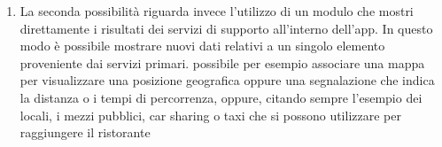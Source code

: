 \begin{itemize}
\begin{enumerate}
	\item La seconda possibilità riguarda invece l'utilizzo di un modulo che mostri direttamente i risultati dei servizi di supporto all'interno dell'app. 
	In questo modo è possibile mostrare nuovi dati relativi a un singolo elemento proveniente dai servizi primari. \upe possibile per esempio associare una mappa per visualizzare una posizione geografica oppure una segnalazione che indica la distanza o i tempi di percorrenza, oppure, citando sempre l'esempio dei locali, i mezzi pubblici, car sharing o taxi che si possono utilizzare per raggiungere il ristorante
	\end{enumerate}
	
\end{itemize}